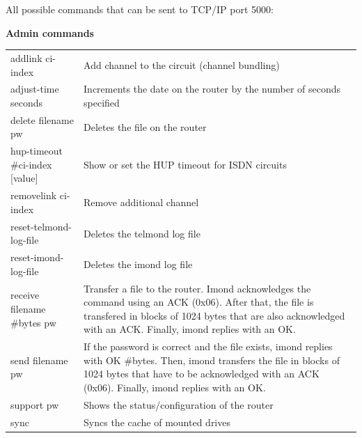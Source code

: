   All possible commands that can be sent to TCP/IP port 5000:
  \begin{table}
    \textbf{Admin commands}

    \vspace{1ex}
    \begin{tabular}{lp{9cm}}

      addlink ci-index              & Add channel to the circuit
                                      (channel bundling) \\
      adjust-time seconds           & Increments the date on the router by
                                      the number of seconds specified \\
      delete filename pw            & Deletes the file on the router \\
      hup-timeout \#ci-index [value]& Show or set the HUP timeout for
                                      ISDN circuits \\
      removelink ci-index           & Remove additional channel \\
      reset-telmond-log-file        & Deletes the telmond log file \\
      reset-imond-log-file          & Deletes the imond log file \\
      receive filename \#bytes pw   & Transfer a file to the router.
                                      Imond acknowledges the command using
                                      an ACK (0x06). After that, the file is
                                      transfered in blocks of 1024 bytes
                                      that are also acknowledged with an ACK.
                                      Finally, imond replies with an OK. \\
      send filename pw              & If the password is correct and the file
                                      exists, imond replies with OK \#bytes.
                                      Then, imond transfers the file in blocks
                                      of 1024 bytes that have to be
                                      acknowledged with an ACK (0x06).
                                      Finally, imond replies with an OK. \\
      support pw                    & Shows the status/configuration of the
                                      router \\
      sync                          & Syncs the cache of mounted drives \\
    \end{tabular}
  \end{table}

